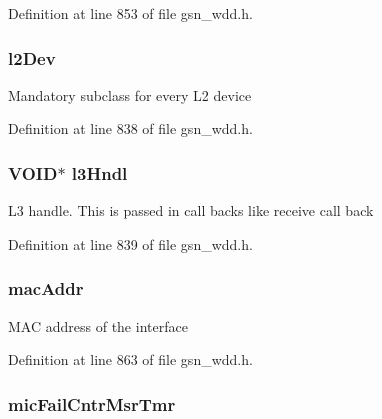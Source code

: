 Definition at line 853 of file gsn\_\-wdd.h.

\hypertarget{a00108_aa0cd5425da571e5b7ad6c6b116e5a4ed}{
\subsubsection[{l2Dev}]{ {\bf l2Dev}}}
\label{a00108_aa0cd5425da571e5b7ad6c6b116e5a4ed}
Mandatory subclass for every L2 device 

Definition at line 838 of file gsn\_\-wdd.h.

\hypertarget{a00108_aaeab14901a77de33349412601376b127}{
\subsubsection[{l3Hndl}]{\setlength{\rightskip}{0pt plus 5cm}VOID$\ast$ {\bf l3Hndl}}}
\label{a00108_aaeab14901a77de33349412601376b127}
L3 handle. This is passed in call backs like receive call back 

Definition at line 839 of file gsn\_\-wdd.h.

\hypertarget{a00108_ab623c15c7dc79be51bcdaa04fba67d90}{
\subsubsection[{macAddr}]{ {\bf macAddr}}}
\label{a00108_ab623c15c7dc79be51bcdaa04fba67d90}
MAC address of the interface 

Definition at line 863 of file gsn\_\-wdd.h.

\hypertarget{a00108_a0ac3781f10e47c3830983ed0d9603359}{
\subsubsection[{micFailCntrMsrTmr}]{ {\bf micFailCntrMsrTmr}}}
\label{a00108_a0ac3781f10e47c3830983ed0d9603359}


